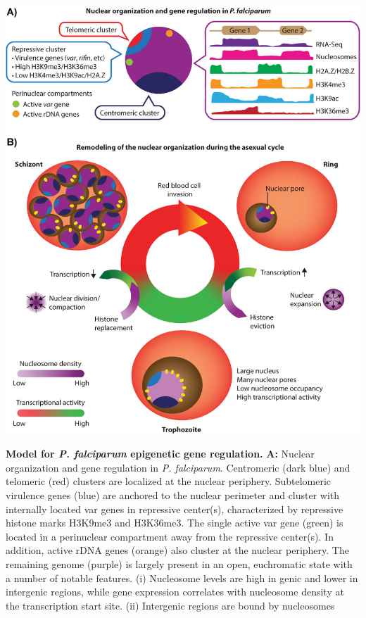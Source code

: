 \begin{FPfigure}
\begin{center}
\includegraphics[width=\linewidth]{figures/fig4.png}
\end{center}
\caption{\textbf{Model for \textit{P. falciparum} epigenetic gene regulation.}
 \textbf{A:} Nuclear organization and gene regulation in \textit{P. falciparum}. Centromeric
 (dark blue) and telomeric (red) clusters are localized at the nuclear
 periphery. Subtelomeric virulence genes (blue) are anchored to the nuclear
 perimeter and cluster with internally located var genes in repressive
 center(s), characterized by repressive histone marks H3K9me3 and H3K36me3.
 The single active var gene (green) is located in a perinuclear compartment
 away from the repressive center(s). In addition, active rDNA genes (orange)
 also cluster at the nuclear periphery. The remaining genome (purple) is
 largely present in an open, euchromatic state with a number of notable
 features. (i) Nucleosome levels are high in genic and lower in intergenic
 regions, while gene expression correlates with nucleosome density at the
 transcription start site. (ii) Intergenic regions are bound by nucleosomes
}
\end{FPfigure}
